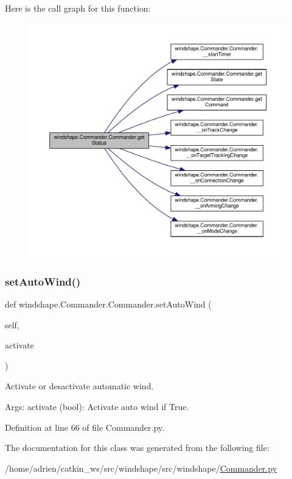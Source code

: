 Here is the call graph for this function\+:\nopagebreak
\begin{figure}[H]
\begin{center}
\leavevmode
\includegraphics[width=350pt]{classwindshape_1_1_commander_1_1_commander_ac5457a24e8bf37f5e89aa16e6b210c9e_cgraph}
\end{center}
\end{figure}
\mbox{\label{classwindshape_1_1_commander_1_1_commander_af0101ad8065016c602ceaf665ab63d6f}} 
\subsubsection{\texorpdfstring{set\+Auto\+Wind()}{setAutoWind()}}
{\footnotesize\ttfamily def windshape.\+Commander.\+Commander.\+set\+Auto\+Wind (\begin{DoxyParamCaption}\item[{}]{self,  }\item[{}]{activate }\end{DoxyParamCaption})}

\begin{DoxyVerb}Activate or desactivate automatic wind.

Args:
    activate (bool): Activate auto wind if True.
\end{DoxyVerb}
 

Definition at line 66 of file Commander.\+py.



The documentation for this class was generated from the following file\+:\begin{DoxyCompactItemize}
\item 
/home/adrien/catkin\+\_\+ws/src/windshape/src/windshape/\mbox{\hyperlink{_commander_8py}{Commander.\+py}}\end{DoxyCompactItemize}
